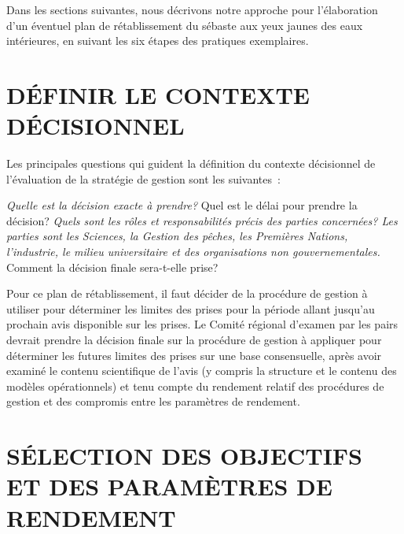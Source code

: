 \documentclass[french,11pt]{book}
\begin{document}
Dans les sections suivantes, nous décrivons notre approche pour l'élaboration d'un éventuel plan de rétablissement du sébaste aux yeux jaunes des eaux intérieures, en suivant les six étapes des pratiques exemplaires.

\hypertarget{sec:decision-context}{%
\section{DÉFINIR LE CONTEXTE DÉCISIONNEL}\label{sec:decision-context}}

Les principales questions qui guident la définition du contexte décisionnel de l'évaluation de la stratégie de gestion sont les suivantes~:

\emph{Quelle est la décision exacte à prendre? }Quel est le délai pour prendre la décision? \emph{Quels sont les rôles et responsabilités précis des parties concernées? Les parties sont les Sciences, la Gestion des pêches, les Premières Nations, l'industrie, le milieu universitaire et des organisations non gouvernementales. }Comment la décision finale sera-t-elle prise?

Pour ce plan de rétablissement, il faut décider de la procédure de gestion à utiliser pour déterminer les limites des prises pour la période allant jusqu'au prochain avis disponible sur les prises. Le Comité régional d'examen par les pairs devrait prendre la décision finale sur la procédure de gestion à appliquer pour déterminer les futures limites des prises sur une base consensuelle, après avoir examiné le contenu scientifique de l'avis (y compris la structure et le contenu des modèles opérationnels) et tenu compte du rendement relatif des procédures de gestion et des compromis entre les paramètres de rendement.

\hypertarget{sec:objectives-metrics}{%
\section{SÉLECTION DES OBJECTIFS ET DES PARAMÈTRES DE RENDEMENT}\label{sec:objectives-metrics}}
\end{document}
